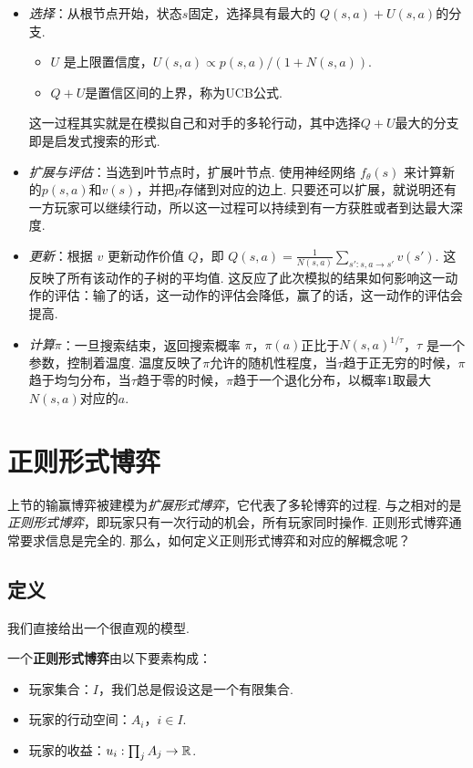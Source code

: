 \begin{itemize}
  \item \textit{选择}：从根节点开始，状态$s$固定，选择具有最大的 $Q(s,a) + U(s,a)$的分支. 
  \begin{itemize}
    \item $U$ 是上限置信度，$U(s,a)\propto{p(s,a)}/(1+N(s,a))$.
    \item $Q+U$是置信区间的上界，称为UCB公式. 
  \end{itemize}
  这一过程其实就是在模拟自己和对手的多轮行动，其中选择$Q+U$最大的分支即是启发式搜索的形式. 

  \item \textit{扩展与评估}：当选到叶节点时，扩展叶节点. 使用神经网络 $f_\theta(s)$ 来计算新的$p(s,a)$和$v(s)$，并把$p$存储到对应的边上. 只要还可以扩展，就说明还有一方玩家可以继续行动，所以这一过程可以持续到有一方获胜或者到达最大深度.

  \item \textit{更新}：根据 $v$ 更新动作价值 $Q$，即 $Q(s, a) = \frac{1}{N(s, a)} \sum_{s': s, a \to s'} v(s')$. 这反映了所有该动作的子树的平均值. 这反应了此次模拟的结果如何影响这一动作的评估：输了的话，这一动作的评估会降低，赢了的话，这一动作的评估会提高.

  \item \textit{计算$\pi$}：一旦搜索结束，返回搜索概率 $\pi$，$\pi(a)$正比于$N(s,a)^{1/\tau}$，$\tau$ 是一个参数，控制着温度. 温度反映了$\pi$允许的随机性程度，当$\tau$趋于正无穷的时候，$\pi$趋于均匀分布，当$\tau$趋于零的时候，$\pi$趋于一个退化分布，以概率$1$取最大$N(s,a)$对应的$a$.
\end{itemize}


\section{正则形式博弈}
上节的输赢博弈被建模为\textit{扩展形式博弈}，它代表了多轮博弈的过程. 与之相对的是\textit{正则形式博弈}，即玩家只有一次行动的机会，所有玩家同时操作. 正则形式博弈通常要求信息是完全的. 那么，如何定义正则形式博弈和对应的解概念呢？

\subsection{定义}

我们直接给出一个很直观的模型. 

\begin{definition}[正则形式博弈]
一个\textbf{正则形式博弈}由以下要素构成：
\begin{itemize}
    \item 玩家集合：$I$，我们总是假设这是一个有限集合.
    \item 玩家的行动空间：$A_i$，$i\in I$.
    \item 玩家的收益：$u_i:\prod_j A_j\to\mathbb{R}$.
\end{itemize}
\end{definition}


